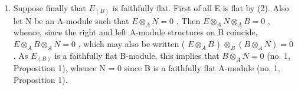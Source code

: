 \begin{enumerate}
\def\labelenumi{(\arabic{enumi})}
\setcounter{enumi}{2}
\tightlist
\item
  Suppose finally that \(E_{(B)}\) is faithfully flat. First of all E is flat by (2). Also let N be an A-module such that \(E \otimes_{A} N = 0\) . Then \(E \otimes_{A} N \otimes_{A} B = 0\) , whence, since the right and left A-module structures on B coincide, \(E \otimes_{A} B \otimes_{A} N = 0\) , which may also be written ( \(E \otimes_{A} B\) ) \(\otimes_{B} (B \otimes_{A} N) = 0\) . As \(E_{(B)}\) is a faithfully flat B-module, this implies that \(B \otimes_{A} N = 0\) (no. 1, Proposition 1), whence N = 0 since B is a faithfully flat A-module (no. 1, Proposition 1).
\end{enumerate}

